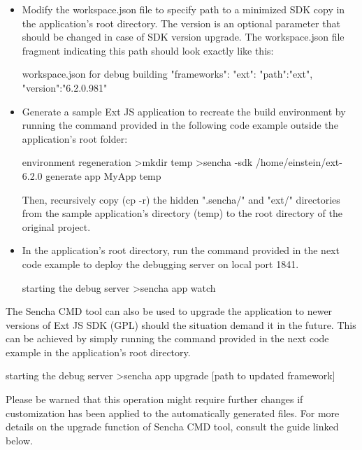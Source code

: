 \begin{itemize}
    \item
         Modify the workspace.json file to specify path to a minimized SDK copy in the application's root directory. The version is an optional parameter that should be changed in case of SDK version upgrade. The workspace.json file fragment indicating this path should look exactly like this:
        \begin{sexylisting}[colback=white]{workspace.json for debug building}
"frameworks": {
    "ext": {
        "path":"ext",
        "version":"6.2.0.981"
    }
}
        \end{sexylisting}
    \item
        Generate a sample Ext JS application to recreate the build environment by running the command provided in the following code example outside the application's root folder:
        \begin{sexylisting}[colback=white]{environment regeneration}
>mkdir temp
>sencha -sdk /home/einstein/ext-6.2.0 generate app
 MyApp temp
        \end{sexylisting}
        Then, recursively copy (cp -r) the hidden ".sencha/" and "ext/" directories from the sample application's directory (temp) to the root directory of the original project.
    \item
        In the application's root directory, run the command provided in the next code example to deploy the debugging server on local port 1841.
        \begin{sexylisting}[colback=white]{starting the debug server}
>sencha app watch
        \end{sexylisting}
\end{itemize}

\newpage

\noindent
The Sencha CMD tool can also be used to upgrade the application to newer versions of Ext JS SDK (GPL) should the situation demand it in the future. This can be achieved by simply running the command provided in the next code example in the application's root directory.

\begin{sexylisting}[colback=white]{starting the debug server}
>sencha app upgrade [path to updated framework]
\end{sexylisting}

\noindent
Please be warned that this operation might require further changes if customization has been applied to the automatically generated files. For more details on the upgrade function of Sencha CMD tool, consult the guide linked below.
\newline

\noindent
{}
